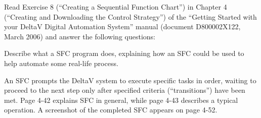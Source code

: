 

Read Exercise 8 (``Creating a Sequential Function Chart'') in Chapter 4 (``Creating and Downloading the Control Strategy'') of the ``Getting Started with your DeltaV Digital Automation System'' manual (document D800002X122, March 2006) and answer the following questions:

\vskip 10pt

Describe what a SFC program does, explaining how an SFC could be used to help automate some real-life process.















An SFC prompts the DeltaV system to execute specific tasks in order, waiting to proceed to the next step only after specified criteria (``transitions'') have been met.  Page 4-42 explains SFC in general, while page 4-43 describes a typical operation.  A screenshot of the completed SFC appears on page 4-52.





